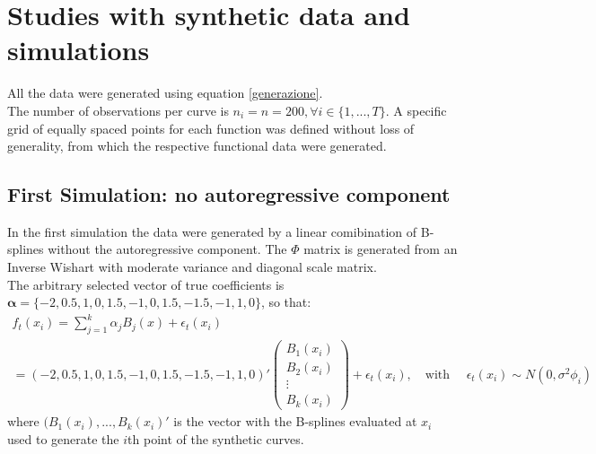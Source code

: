 \section{Studies with synthetic data and simulations}
All the data were generated using equation \ref{generazione}. \\
The number of observations per curve is $n_i = n = 200, \forall i \in \{1, ... , T\}$. A specific grid of equally spaced points for each function was defined without loss of generality, from which the respective functional data were generated.
\subsection{First Simulation: no autoregressive component}
In the first simulation the data were generated by a linear comibination of B-splines without the autoregressive component. The $\Phi$ matrix is generated from an Inverse Wishart with moderate variance and diagonal scale matrix.  \\
The arbitrary selected vector of true coefficients is $\boldsymbol{\alpha} = \{ -2 , 0.5, 1, 0, 1.5, -1, 0, 1.5, -1.5, -1, 1, 0 \}$, so that: 
\begin{gather*}
    f_t(x_i) = \sum_{j=1}^k \alpha_j B_j(x) + \epsilon_t(x_i) \\
    =(-2 , 0.5, 1, 0, 1.5, -1, 0, 1.5, -1.5, -1, 1, 0)' 
    \left(
    \begin{matrix}
        B_1(x_i) \\
        B_2(x_i) \\
        \vdots \\
        B_k(x_i) 
    \end{matrix} \right) + \epsilon_t(x_i), \quad \text{with } \quad \epsilon_t(x_i) \sim N(0, \sigma^2 \phi_i)
\end{gather*}
where $(B_1(x_i), ..., B_k(x_i)'$ is the vector with the B-splines evaluated at $x_i$ used to generate the $i$th point of the synthetic curves. 
